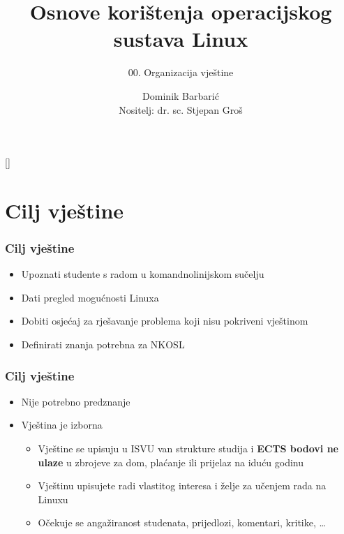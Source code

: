 \documentclass{beamer}
\title{Osnove korištenja operacijskog sustava Linux}
\subtitle{00. Organizacija vještine}
\author[Dominik Barbarić]{Dominik Barbarić\\{\small Nositelj: dr. sc. Stjepan Groš}}
\institute[FER]{Sveučilište u Zagrebu \\
				Fakultet elektrotehnike i računarstva}
\date{\todayiso}
\begin{document}
{
[] %

\begin{frame}
\maketitle
\end{frame}
}

\section{Cilj vještine}
\begin{frame}[t]
	\frametitle{Cilj vještine}
	\begin{itemize}
		\item Upoznati studente s radom u komandnolinijskom sučelju
		\item Dati pregled mogućnosti Linuxa
		\item Dobiti osjećaj za rješavanje problema koji nisu pokriveni vještinom
		\item Definirati znanja potrebna za NKOSL
	\end{itemize}
\end{frame}

\begin{frame}[t]
	\frametitle{Cilj vještine}
	\begin{itemize}
		\item Nije potrebno predznanje
		\item Vještina je izborna
		\begin{itemize}
			\item Vještine se upisuju u ISVU van strukture studija i \textbf{ECTS bodovi ne ulaze} u zbrojeve za dom, plaćanje ili prijelaz na iduću godinu
			\item Vještinu upisujete radi vlastitog interesa i želje za učenjem rada na Linuxu
			\item Očekuje se angažiranost studenata, prijedlozi, komentari, kritike, \ldots
		\end{itemize}
	\end{itemize}
\end{frame}
\end{document}
